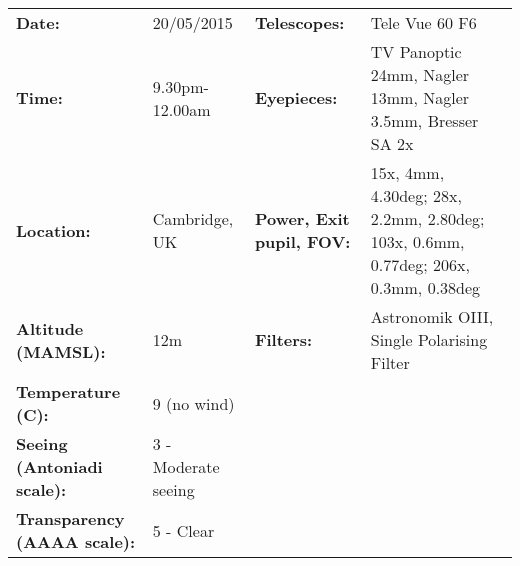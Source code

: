 \begin{tabular}{ p{1.7in} p{1.2in} p{1.5in} p{4.2in}}
{\bf Date:} & 20/05/2015 & {\bf Telescopes:} & Tele Vue 60 F6 \\ 
{\bf Time:} & 9.30pm-12.00am & {\bf Eyepieces:} & TV Panoptic 24mm, Nagler 13mm, Nagler 3.5mm, Bresser SA 2x \\ 
{\bf Location:} & Cambridge, UK & {\bf Power, Exit pupil, FOV:} & 15x, 4mm, 4.30deg; 28x, 2.2mm, 2.80deg; 103x, 0.6mm, 0.77deg; 206x, 0.3mm, 0.38deg \\ 
{\bf Altitude (MAMSL):} & 12m & {\bf Filters:} & Astronomik OIII, Single Polarising Filter \\ 
{\bf Temperature (C):} & 9 (no wind) & & \\ 
{\bf Seeing (Antoniadi scale):} & 3 - Moderate seeing & & \\ 
{\bf Transparency (AAAA scale):} & 5 - Clear & & \\ 
\end{tabular}
\centering 
